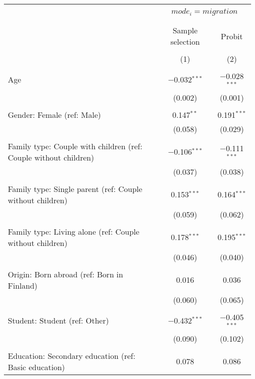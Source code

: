 
\begin{table}[!htbp] \centering 
  \caption{} 
  \label{} 
\begin{tabular}{@{\extracolsep{5pt}}lcc} 
\\[-1.8ex]\hline 
\hline \\[-1.8ex] 
 & \multicolumn{2}{c}{$mode_i = migration$} \\ 
\cline{2-3} 
\\[-1.8ex] &  &  \\ 
 & Sample selection & Probit \\ 
\\[-1.8ex] & (1) & (2)\\ 
\hline \\[-1.8ex] 
 Age & $-$0.032$^{***}$ & $-$0.028$^{***}$ \\ 
  & (0.002) & (0.001) \\ 
  & & \\ 
 Gender: Female (ref: Male) & 0.147$^{**}$ & 0.191$^{***}$ \\ 
  & (0.058) & (0.029) \\ 
  & & \\ 
 Family type: Couple with children (ref: Couple without children) & $-$0.106$^{***}$ & $-$0.111$^{***}$ \\ 
  & (0.037) & (0.038) \\ 
  & & \\ 
 Family type: Single parent (ref: Couple without children) & 0.153$^{***}$ & 0.164$^{***}$ \\ 
  & (0.059) & (0.062) \\ 
  & & \\ 
 Family type: Living alone (ref: Couple without children) & 0.178$^{***}$ & 0.195$^{***}$ \\ 
  & (0.046) & (0.040) \\ 
  & & \\ 
 Origin: Born abroad (ref: Born in Finland) & 0.016 & 0.036 \\ 
  & (0.060) & (0.065) \\ 
  & & \\ 
 Student: Student (ref: Other) & $-$0.432$^{***}$ & $-$0.405$^{***}$ \\ 
  & (0.090) & (0.102) \\ 
  & & \\ 
 Education: Secondary education (ref: Basic education) & 0.078 & 0.086 \\ 

\end{tabular}
\end{table}
